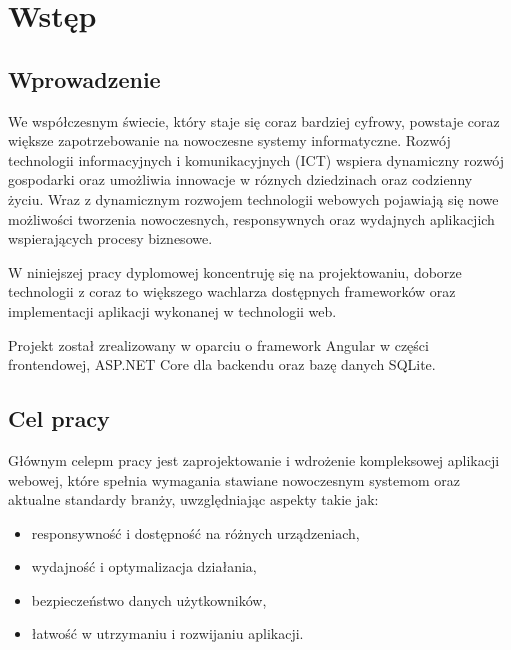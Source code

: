%


\chapter*{Wstęp}

\section*{Wprowadzenie}

We współczesnym świecie, który staje się coraz bardziej cyfrowy, powstaje coraz większe zapotrzebowanie na nowoczesne systemy informatyczne.
Rozwój technologii informacyjnych i komunikacyjnych (ICT) wspiera dynamiczny rozwój gospodarki oraz umożliwia innowacje w róznych dziedzinach oraz codzienny życiu.
Wraz z dynamicznym rozwojem technologii webowych pojawiają się nowe możliwości tworzenia nowoczesnych, responsywnych oraz wydajnych aplikacjich wspierających procesy biznesowe.

W niniejszej pracy dyplomowej koncentruję się na projektowaniu, doborze technologii z coraz to większego wachlarza dostępnych frameworków oraz implementacji aplikacji wykonanej w technologii web.

Projekt został zrealizowany w oparciu o framework Angular w części frontendowej, ASP.NET Core dla backendu oraz bazę danych SQLite.

\section*{Cel pracy}

Głównym celepm pracy jest zaprojektowanie i wdrożenie kompleksowej aplikacji webowej, które spełnia wymagania stawiane nowoczesnym systemom oraz aktualne standardy branży, uwzględniając aspekty takie jak:
\begin{itemize}
    \item responsywność i dostępność na różnych urządzeniach,
    \item wydajność i optymalizacja działania,
    \item bezpieczeństwo danych użytkowników,
    \item łatwość w utrzymaniu i rozwijaniu aplikacji.
\end{itemize}

